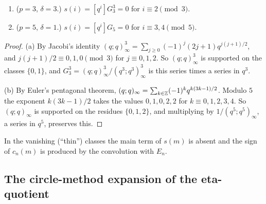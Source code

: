 \begin{lemma}\label{lem:vanish}
\begin{enumerate}
\item[(a)] ($p=3$, $\delta=3$.) $s(i)=[q^i]G_3^3=0$ for $i\equiv2\pmod3$.
\item[(b)] ($p=5$, $\delta=1$.) $s(i)=[q^i]G_5=0$ for $i\equiv3,4\pmod5$.
\end{enumerate}
\end{lemma}
\begin{proof}
(a) By Jacobi's identity $(q;q)_\infty^3=\sum_{j\ge0}(-1)^j(2j+1)q^{j(j+1)/2}$, and $j(j+1)/2\equiv0,1,0\pmod3$ for
$j\equiv0,1,2$. So $(q;q)_\infty^3$ is supported on the classes $\{0,1\}$, and $G_3^3=(q;q)^3_\infty/(q^3;q^3)^3_\infty$ is
this series times a series in $q^3$.

(b) By Euler's pentagonal theorem, $(q;q)_\infty=\sum_{k\in\mathbb Z}(-1)^kq^{k(3k-1)/2}$. Modulo $5$ the exponent $k(3k-1)/2$
takes the values $0,1,0,2,2$ for $k\equiv0,1,2,3,4$. So $(q;q)_\infty$ is supported on the residues $\{0,1,2\}$, and
multiplying by $1/(q^5;q^5)_\infty$, a series in $q^5$, preserves this.
\end{proof}

In the vanishing (``thin'') classes the main term of $s(m)$ is absent and the sign of $c_n(m)$ is produced by the
convolution with $E_n$.

\subsection{The circle-method expansion of the eta-quotient}\label{sec:circle-general}

